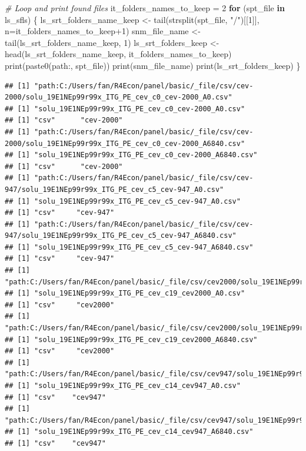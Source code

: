 \documentclass[
]{book}
\newenvironment{Shaded}{\begin{snugshade}}{\end{snugshade}}
\newcommand{\AttributeTok}[1]{\textcolor[rgb]{0.77,0.63,0.00}{#1}}
\newcommand{\CommentTok}[1]{\textcolor[rgb]{0.56,0.35,0.01}{\textit{#1}}}
\newcommand{\ControlFlowTok}[1]{\textcolor[rgb]{0.13,0.29,0.53}{\textbf{#1}}}
\newcommand{\DecValTok}[1]{\textcolor[rgb]{0.00,0.00,0.81}{#1}}
\newcommand{\FunctionTok}[1]{\textcolor[rgb]{0.00,0.00,0.00}{#1}}
\newcommand{\NormalTok}[1]{#1}
\newcommand{\OtherTok}[1]{\textcolor[rgb]{0.56,0.35,0.01}{#1}}
\newcommand{\SpecialCharTok}[1]{\textcolor[rgb]{0.00,0.00,0.00}{#1}}
\newcommand{\StringTok}[1]{\textcolor[rgb]{0.31,0.60,0.02}{#1}}
\begin{document}
\begin{Shaded}
\begin{Highlighting}[]
\CommentTok{\# Loop and print found files}
\NormalTok{it\_folders\_names\_to\_keep }\OtherTok{=} \DecValTok{2}
\ControlFlowTok{for}\NormalTok{ (spt\_file }\ControlFlowTok{in}\NormalTok{ ls\_sfls) \{}
\NormalTok{    ls\_srt\_folders\_name\_keep }\OtherTok{\textless{}{-}} \FunctionTok{tail}\NormalTok{(}\FunctionTok{strsplit}\NormalTok{(spt\_file, }\StringTok{"/"}\NormalTok{)[[}\DecValTok{1}\NormalTok{]], }\AttributeTok{n=}\NormalTok{it\_folders\_names\_to\_keep}\SpecialCharTok{+}\DecValTok{1}\NormalTok{)}
\NormalTok{    snm\_file\_name }\OtherTok{\textless{}{-}} \FunctionTok{tail}\NormalTok{(ls\_srt\_folders\_name\_keep, }\DecValTok{1}\NormalTok{)}
\NormalTok{    ls\_srt\_folders\_keep }\OtherTok{\textless{}{-}} \FunctionTok{head}\NormalTok{(ls\_srt\_folders\_name\_keep, it\_folders\_names\_to\_keep)}
    \FunctionTok{print}\NormalTok{(}\FunctionTok{paste0}\NormalTok{(}\StringTok{\textquotesingle{}path:\textquotesingle{}}\NormalTok{, spt\_file))}
    \FunctionTok{print}\NormalTok{(snm\_file\_name)}
    \FunctionTok{print}\NormalTok{(ls\_srt\_folders\_keep)}
\NormalTok{\}}
\end{Highlighting}
\end{Shaded}

\begin{verbatim}
## [1] "path:C:/Users/fan/R4Econ/panel/basic/_file/csv/cev-2000/solu_19E1NEp99r99x_ITG_PE_cev_c0_cev-2000_A0.csv"
## [1] "solu_19E1NEp99r99x_ITG_PE_cev_c0_cev-2000_A0.csv"
## [1] "csv"      "cev-2000"
## [1] "path:C:/Users/fan/R4Econ/panel/basic/_file/csv/cev-2000/solu_19E1NEp99r99x_ITG_PE_cev_c0_cev-2000_A6840.csv"
## [1] "solu_19E1NEp99r99x_ITG_PE_cev_c0_cev-2000_A6840.csv"
## [1] "csv"      "cev-2000"
## [1] "path:C:/Users/fan/R4Econ/panel/basic/_file/csv/cev-947/solu_19E1NEp99r99x_ITG_PE_cev_c5_cev-947_A0.csv"
## [1] "solu_19E1NEp99r99x_ITG_PE_cev_c5_cev-947_A0.csv"
## [1] "csv"     "cev-947"
## [1] "path:C:/Users/fan/R4Econ/panel/basic/_file/csv/cev-947/solu_19E1NEp99r99x_ITG_PE_cev_c5_cev-947_A6840.csv"
## [1] "solu_19E1NEp99r99x_ITG_PE_cev_c5_cev-947_A6840.csv"
## [1] "csv"     "cev-947"
## [1] "path:C:/Users/fan/R4Econ/panel/basic/_file/csv/cev2000/solu_19E1NEp99r99x_ITG_PE_cev_c19_cev2000_A0.csv"
## [1] "solu_19E1NEp99r99x_ITG_PE_cev_c19_cev2000_A0.csv"
## [1] "csv"     "cev2000"
## [1] "path:C:/Users/fan/R4Econ/panel/basic/_file/csv/cev2000/solu_19E1NEp99r99x_ITG_PE_cev_c19_cev2000_A6840.csv"
## [1] "solu_19E1NEp99r99x_ITG_PE_cev_c19_cev2000_A6840.csv"
## [1] "csv"     "cev2000"
## [1] "path:C:/Users/fan/R4Econ/panel/basic/_file/csv/cev947/solu_19E1NEp99r99x_ITG_PE_cev_c14_cev947_A0.csv"
## [1] "solu_19E1NEp99r99x_ITG_PE_cev_c14_cev947_A0.csv"
## [1] "csv"    "cev947"
## [1] "path:C:/Users/fan/R4Econ/panel/basic/_file/csv/cev947/solu_19E1NEp99r99x_ITG_PE_cev_c14_cev947_A6840.csv"
## [1] "solu_19E1NEp99r99x_ITG_PE_cev_c14_cev947_A6840.csv"
## [1] "csv"    "cev947"
\end{verbatim}
\end{document}
